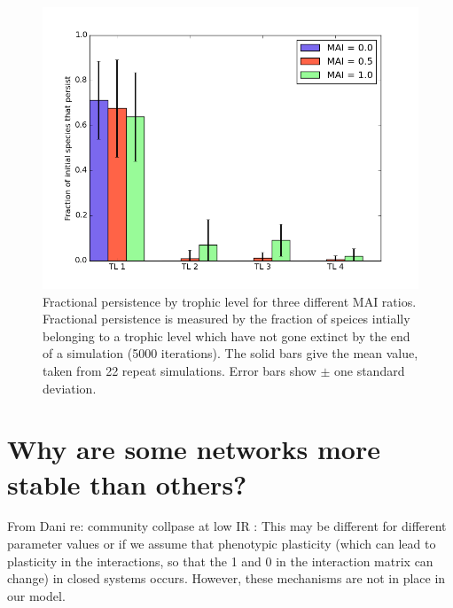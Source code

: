 \begin{figure}
	\centering
	\includegraphics[width=0.8\linewidth]{"figures/hist_species_per_tl_zeroIR"}
	\caption{Fractional persistence by trophic level for three different MAI ratios. Fractional persistence is measured by the fraction of speices intially belonging to a trophic level which have not gone extinct by the end of a simulation (5000 iterations). The solid bars give the mean value, taken  from 22 repeat simulations. Error bars show $\pm$ one standard deviation.}
	\label{fig:mvp_hist_zeroIR}
\end{figure}


\section{Why are some networks more stable than others?}



From Dani re: community collpase at low IR : This may be different for different parameter values or if we assume that phenotypic plasticity (which can lead to plasticity in the interactions, so that the 1 and 0 in the interaction matrix can change) in closed systems occurs. However, these mechanisms are not in place in our model.